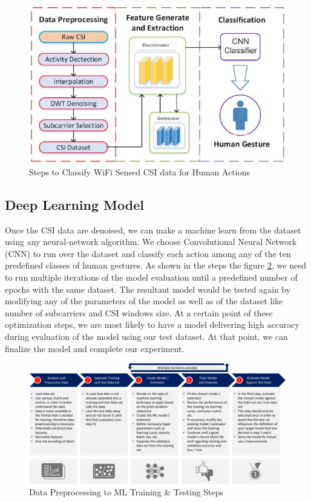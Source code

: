 \documentclass[conference]{IEEEtran}
\begin{document}
\begin{figure}[htbp]
\centerline{\includegraphics[scale=0.4]{images/steps_wifi_sensed_ml.jpg}}
\caption{Steps to Classify WiFi Sensed CSI data for Human Actions}
\label{fig_steps_wifi_sensing_ml}
\end{figure}


\subsection{Deep Learning Model}
Once the CSI data are denoised, we can make a machine learn from the dataset using any neural-network algorithm. We choose Convolutional Neural Network (CNN) to run over the dataset and classify each action among any of the ten predefined classes of human gestures. As shown in the steps the figure \ref{fig_train_steps}, we need to run multiple iterations of the model evaluation until a predefined number of epochs with the same dataset. The resultant model would be tested again by modifying any of the parameters of the model as well as of the dataset like number of subcarriers and CSI windows size. At a certain point of these optimization steps, we are most likely to have a model delivering high accuracy during evaluation of the model using our test dataset. At that point, we can finalize the model and complete our experiment.

\begin{figure}[htbp]
\centerline{\includegraphics[scale=0.15]{images/train_steps.png}}
\caption{Data Preprocessing to ML Training \& Testing Steps \cite{img_har_categories} \cite{imu_lidar}}
\label{fig_train_steps}
\end{figure}
\end{document}
